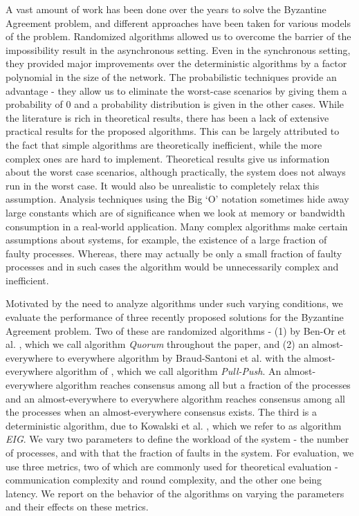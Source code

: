A vast amount of work has been done over the years to solve the Byzantine Agreement problem, and different approaches have been taken for various models of the problem. Randomized algorithms allowed us to overcome the barrier of the impossibility result in the asynchronous setting. Even in the synchronous setting, they provided major improvements over the deterministic algorithms by a factor polynomial in the size of the network. The probabilistic techniques provide an advantage - they allow us to eliminate the worst-case scenarios by giving them a probability of $0$ and a probability distribution is given in the other cases. While the literature is rich in theoretical results, there has been a lack of extensive practical results for the proposed algorithms. This can be largely attributed to the fact that simple algorithms are theoretically inefficient, while the more complex ones are hard to implement. Theoretical results give us information about the worst case scenarios, although practically, the system does not always run in the worst case. It would also be unrealistic to completely relax this assumption. Analysis techniques using the Big `O' notation sometimes hide away large constants which are of significance when we look at memory or bandwidth consumption in a real-world application. Many complex algorithms make certain assumptions about systems, for example, the existence of a large fraction of faulty processes. Whereas, there may actually be only a small fraction of faulty processes and in such cases the algorithm would be unnecessarily complex and inefficient.

Motivated by the need to analyze algorithms under such varying conditions, we evaluate the performance of three recently proposed solutions for the Byzantine Agreement problem. Two of these are randomized algorithms - (1) by Ben-Or et al. \cite{BPV06}, which we call algorithm \textit{Quorum} throughout the paper, and (2) an almost-everywhere to everywhere algorithm by Braud-Santoni et al. \cite{BGH13} with the almost-everywhere algorithm of \cite{KSSV06}, which we call algorithm \textit{Pull-Push}. An almost-everywhere algorithm reaches consensus among all but a fraction of the processes and an almost-everywhere to everywhere algorithm reaches consensus among all the processes when an almost-everywhere consensus exists. The third is a deterministic algorithm, due to Kowalski et al. \cite{KM13}, which we refer to as algorithm \textit{EIG}. We vary two parameters to define the workload of the system - the number of processes, and with that the fraction of faults in the system. For evaluation, we use three metrics, two of which are commonly used for theoretical evaluation - communication complexity and round complexity, and the other one being latency. We report on the behavior of the algorithms on varying the parameters and their effects on these metrics. 

